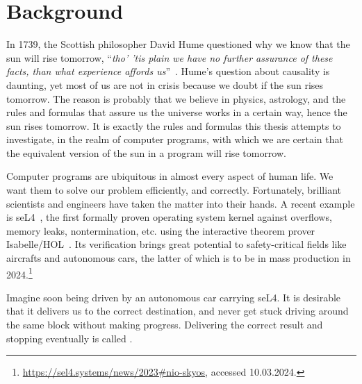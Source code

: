 \chapter{Background}\label{ch:background}
\renewcommand{\thefigure}{\arabic{chapter}.\arabic{figure}}
\renewcommand{\thetable}{\arabic{chapter}.\arabic{table}}


In 1739, the Scottish philosopher David Hume questioned why we know that the sun will rise tomorrow, ``\textit{tho' 'tis plain we have no further assurance of these facts, than what experience affords us}''~\cite{hume1896}. 
Hume's question about causality is daunting, yet most of us are not in crisis because we doubt if the sun rises tomorrow. 
The reason is probably that we believe in physics, astrology, and the rules and formulas that assure us the universe works in a certain way, hence the sun rises tomorrow. 
It is exactly the rules and formulas this thesis attempts to investigate, in the realm of computer programs, with which we are certain that the equivalent version of the sun in a program will rise tomorrow. 

Computer programs are ubiquitous in almost every aspect of human life. 
We want them to solve our problem efficiently, and correctly. 
Fortunately, brilliant scientists and engineers have taken the matter into their hands. 
A recent example is seL4~\cite{klein09}, the first formally proven operating system kernel against overflows, memory leaks, nontermination, etc. using the interactive theorem prover Isabelle/HOL~\cite{nipkow2002isabelle}. 
Its verification brings great potential to safety-critical fields like aircrafts and autonomous cars, the latter of which is to be in mass production in 2024.\footnote{\url{https://sel4.systems/news/2023\#nio-skyos}, accessed 10.03.2024. }

Imagine soon being driven by an autonomous car carrying seL4. 
It is desirable that it delivers us to the correct destination, and never get stuck driving around the same block without making progress. 
Delivering the correct result and stopping eventually is called . 

